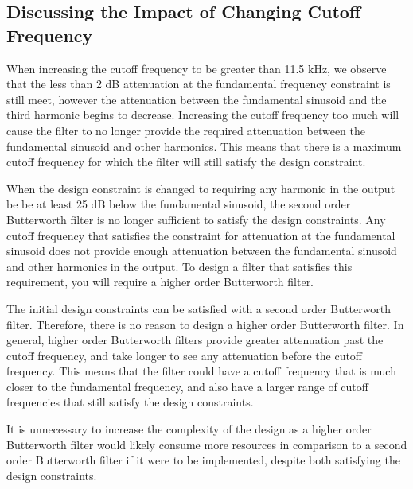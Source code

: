 \documentclass[12pt]{article}
\begin{document}
\subsection*{Discussing the Impact of Changing Cutoff Frequency}
When increasing the cutoff frequency to be greater than 11.5 kHz, we observe that the less than 2 dB attenuation at the fundamental frequency constraint is still meet, however the attenuation between the fundamental sinusoid and the third harmonic begins to decrease. Increasing the cutoff frequency too much will cause the filter to no longer provide the required attenuation between the fundamental sinusoid and other harmonics. This means that there is a maximum cutoff frequency for which the filter will still satisfy the design constraint.

When the design constraint is changed to requiring any harmonic in the output be be at least 25 dB below the fundamental sinusoid, the second order Butterworth filter is no longer sufficient to satisfy the design constraints. Any cutoff frequency that satisfies the constraint for attenuation at the fundamental sinusoid does not provide enough attenuation between the fundamental sinusoid and other harmonics in the output. To design a filter that satisfies this requirement, you will require a higher order Butterworth filter.

The initial design constraints can be satisfied with a second order Butterworth filter. Therefore, there is no reason to design a higher order Butterworth filter. In general, higher order Butterworth filters provide greater attenuation past the cutoff frequency, and take longer to see any attenuation before the cutoff frequency. This means that the filter could have a cutoff frequency that is much closer to the fundamental frequency, and also have a larger range of cutoff frequencies that still satisfy the design constraints. 

It is unnecessary to increase the complexity of the design as a higher order Butterworth filter would likely consume more resources in comparison to a second order Butterworth filter if it were to be implemented, despite both satisfying the design constraints.

\end{document}
